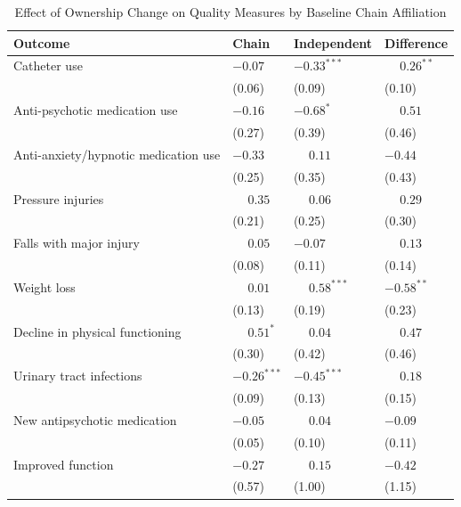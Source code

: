 \documentclass[11pt]{article}
\begin{document}
\begin{table}[!ht]
\begin{threeparttable}
\end{threeparttable}
\end{table}
\clearpage
\begin{table}[!ht]
\centering
\begin{threeparttable}
\caption{Effect of Ownership Change on Quality Measures by Baseline Chain Affiliation}
\label{tab:chain-interaction-quality}
\small
\setlength{\tabcolsep}{6pt}

\begin{tabularx}{\textwidth}{@{} l Y Y Y @{}}
\toprule
Outcome & Chain & Independent & Difference \\
\midrule
Catheter use & $-0.07$ & $-0.33^{***}$ & $\phantom{-}0.26^{**}$ \\
 & (0.06) & (0.09) & (0.10) \\[3pt]
Anti-psychotic medication use & $-0.16$ & $-0.68^{*}$ & $\phantom{-}0.51$ \\
 & (0.27) & (0.39) & (0.46) \\[3pt]
Anti-anxiety/hypnotic medication use & $-0.33$ & $\phantom{-}0.11$ & $-0.44$ \\
 & (0.25) & (0.35) & (0.43) \\[3pt]
Pressure injuries & $\phantom{-}0.35$ & $\phantom{-}0.06$ & $\phantom{-}0.29$ \\
 & (0.21) & (0.25) & (0.30) \\[3pt]
Falls with major injury & $\phantom{-}0.05$ & $-0.07$ & $\phantom{-}0.13$ \\
 & (0.08) & (0.11) & (0.14) \\[3pt]
Weight loss & $\phantom{-}0.01$ & $\phantom{-}0.58^{***}$ & $-0.58^{**}$ \\
 & (0.13) & (0.19) & (0.23) \\[3pt]
Decline in physical functioning & $\phantom{-}0.51^{*}$ & $\phantom{-}0.04$ & $\phantom{-}0.47$ \\
 & (0.30) & (0.42) & (0.46) \\[3pt]
Urinary tract infections & $-0.26^{***}$ & $-0.45^{***}$ & $\phantom{-}0.18$ \\
 & (0.09) & (0.13) & (0.15) \\[3pt]
New antipsychotic medication & $-0.05$ & $\phantom{-}0.04$ & $-0.09$ \\
 & (0.05) & (0.10) & (0.11) \\[3pt]
Improved function & $-0.27$ & $\phantom{-}0.15$ & $-0.42$ \\
 & (0.57) & (1.00) & (1.15) \\[3pt]
\bottomrule
\end{tabularx}


\end{threeparttable}
\end{table}
\end{document}
